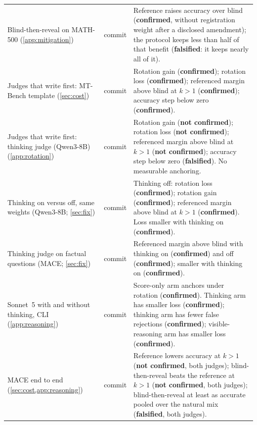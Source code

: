 {\begin{longtable}{L{3.2cm}L{1.1cm}L{8.7cm}}
Blind-then-reveal on MATH-500 (\cref{app:mitigation}) & commit & Reference raises accuracy over blind (\textbf{confirmed}, without registration weight after a disclosed amendment); the protocol keeps less than half of that benefit (\textbf{falsified}: it keeps nearly all of it). \\
Judges that write first: MT-Bench template (\cref{sec:cost}) & commit & Rotation gain (\textbf{confirmed}); rotation loss (\textbf{confirmed}); referenced margin above blind at $k{>}1$ (\textbf{confirmed}); accuracy step below zero (\textbf{confirmed}). \\
Judges that write first: thinking judge (Qwen3-8B) (\cref{app:rotation}) & commit & Rotation gain (\textbf{not confirmed}); rotation loss (\textbf{not confirmed}); referenced margin above blind at $k{>}1$ (\textbf{not confirmed}); accuracy step below zero (\textbf{falsified}). No measurable anchoring. \\
Thinking on versus off, same weights (Qwen3-8B; \cref{sec:fix}) & commit & Thinking off: rotation loss (\textbf{confirmed}); rotation gain (\textbf{confirmed}); referenced margin above blind at $k{>}1$ (\textbf{confirmed}). Loss smaller with thinking on (\textbf{confirmed}). \\
Thinking judge on factual questions (\textsc{MACE}; \cref{sec:fix}) & commit & Referenced margin above blind with thinking on (\textbf{confirmed}) and off (\textbf{confirmed}); smaller with thinking on (\textbf{confirmed}). \\
Sonnet~5 with and without thinking, CLI (\cref{app:reasoning}) & commit & Score-only arm anchors under rotation (\textbf{confirmed}). Thinking arm has smaller loss (\textbf{confirmed}); thinking arm has fewer false rejections (\textbf{confirmed}); visible-reasoning arm has smaller loss (\textbf{confirmed}). \\
\textsc{MACE} end to end (\cref{sec:cost,app:reasoning}) & commit & Reference lowers accuracy at $k{>}1$ (\textbf{not confirmed}, both judges); blind-then-reveal beats the reference at $k{>}1$ (\textbf{not confirmed}, both judges); blind-then-reveal at least as accurate pooled over the natural mix (\textbf{falsified}, both judges). \\

\end{longtable}}
